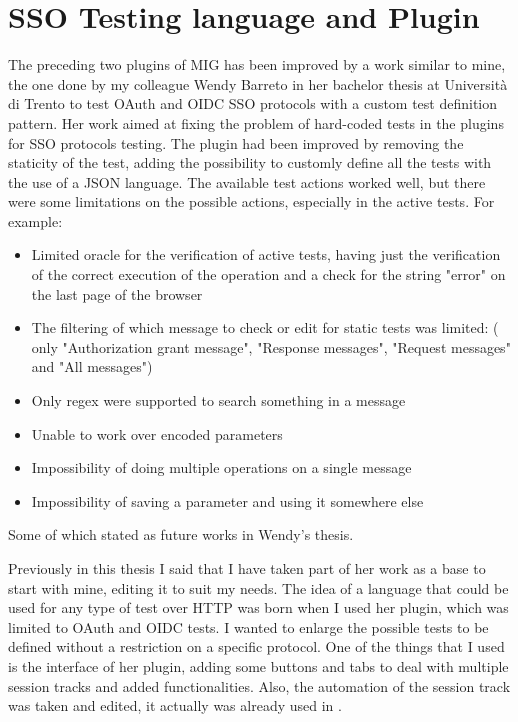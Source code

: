 \section{SSO Testing language and Plugin}
The preceding two plugins of MIG has been improved by a work similar to mine, the one done by my colleague Wendy Barreto \cite{wendy_barreto} in her bachelor thesis at Università di Trento to test OAuth and OIDC SSO protocols with a custom test definition pattern. Her work aimed at fixing the problem of hard-coded tests in the plugins for SSO protocols testing. The plugin had been improved by removing the staticity of the test, adding the possibility to customly define all the tests with the use of a JSON language.
The available test actions worked well, but there were some limitations on the possible actions, especially in the active tests. For example:
\begin{itemize}
    \item Limited oracle for the verification of active tests, having just the verification of the correct execution of the operation and a check for the string "error" on the last page of the browser
    \item The filtering of which message to check or edit for static tests was limited: ( only "Authorization grant message", "Response messages", "Request messages" and "All messages")
    \item Only regex were supported to search something in a message
    \item Unable to work over encoded parameters
    \item Impossibility of doing multiple operations on a single message
    \item Impossibility of saving a parameter and using it somewhere else
\end{itemize}
Some of which stated as future works in Wendy's thesis.

Previously in this thesis I said that I have taken part of her work as a base to start with mine, editing it to suit my needs. The idea of a language that could be used for any type of test over HTTP was born when I used her plugin, which was limited to OAuth and OIDC tests. I wanted to enlarge the possible tests to be defined without a restriction on a specific protocol. 
One of the things that I used is the interface of her plugin, adding some buttons and tabs to deal with multiple \gls{session track}s and added functionalities. Also, the automation of the \gls{session track} was taken and edited, it actually was already used in \cite{claudio_grisenti}\cite{stefano_facchini}.

